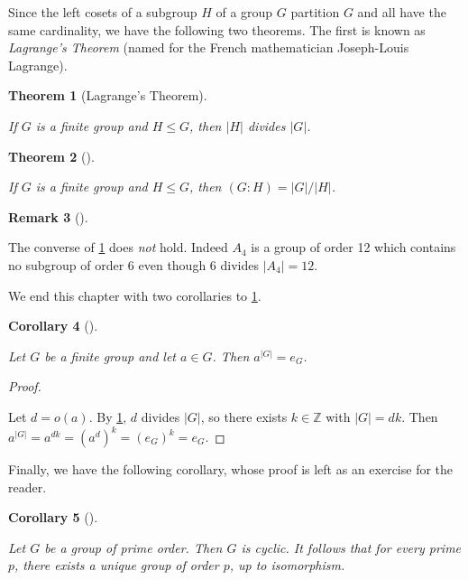 \documentclass[10pt,]{book}
\theoremstyle{plain}
\newtheorem{theorem}{Theorem}[section]
\newtheorem{corollary}[theorem]{Corollary}
\theoremstyle{definition}
\theoremstyle{definition}
\newtheorem{remark}[theorem]{Remark}
\theoremstyle{definition}
\theoremstyle{definition}
\numberwithin{equation}{section}
\def\Z{\mathbb{Z}}
\begin{document}
    Since the left cosets of a subgroup \(H\) of a group \(G\)
    partition \(G\) and all have the same cardinality, we have the
    following two theorems. The first is known as \emph{Lagrange's
    Theorem} (named for the French mathematician Joseph-Louis Lagrange).%
\begin{theorem}[{Lagrange's Theorem}]\label{lagrange}

         If \(G\) is a finite
        group and \(H\leq G\), then \(|H|\) divides \(|G|\).
\end{theorem}
\begin{theorem}[{}]\label{indexfin}

        If \(G\) is a finite group and \(H\leq G\), then
        \((G:H)=|G|/|H|\).
\end{theorem}
\begin{remark}[]\label{remark-42}

      The converse of
      \hyperref[lagrange]{\ref{lagrange}} does \emph{not} hold. Indeed \(A_4\) is a group of order 12 which contains no subgroup of
      order \(6\) even though \(6\) divides \(|A_4|=12\).
\end{remark}
\par

    We end this chapter with two corollaries to \hyperref[lagrange]{\ref{lagrange}}.
\begin{corollary}[{}]\label{corollary-6}

        Let \(G\) be a finite group and let \(a\in G\). Then
        \(a^{|G|}=e_G\).
\end{corollary}
\begin{proof}\hypertarget{proof-40}{}

      Let \(d=o(a)\). By \hyperref[lagrange]{\ref{lagrange}}, \(d\) divides \(|G|\), so
      there exists \(k\in \Z\) with \(|G|=dk\). Then
      \(a^{|G|}=a^{dk}=(a^d)^k=(e_G)^k=e_G.\)
\end{proof}
\par
Finally, we have the following corollary, whose proof is left as an exercise for the reader.%
\begin{corollary}[{}]\label{pcyc}

        Let \(G\) be a group of prime order. Then \(G\) is
        cyclic. It follows that for every prime \(p\), there exists a unique
        group of order \(p\), up to isomorphism.%
\end{corollary}
\typeout{************************************************}
\typeout{************************************************}
\end{document}
